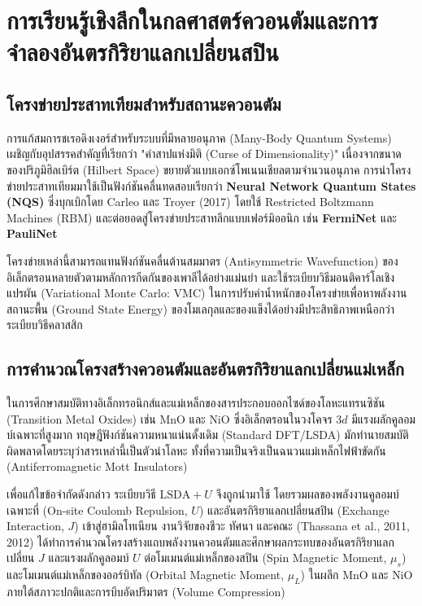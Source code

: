 \section{การเรียนรู้เชิงลึกในกลศาสตร์ควอนตัมและการจำลองอันตรกิริยาแลกเปลี่ยนสปิน}

\subsection{โครงข่ายประสาทเทียมสำหรับสถานะควอนตัม}
การแก้สมการชเรอดิงเงอร์สำหรับระบบที่มีหลายอนุภาค (Many-Body Quantum Systems) เผชิญกับอุปสรรคสำคัญที่เรียกว่า "คำสาปแห่งมิติ (Curse of Dimensionality)" เนื่องจากขนาดของปริภูมิฮิลเบิร์ต (Hilbert Space) ขยายตัวแบบเอกซ์โพเนนเชียลตามจำนวนอนุภาค การนำโครงข่ายประสาทเทียมมาใช้เป็นฟังก์ชันคลื่นทดสอบเรียกว่า \textbf{Neural Network Quantum States (NQS)} ซึ่งบุกเบิกโดย Carleo และ Troyer (2017) โดยใช้ Restricted Boltzmann Machines (RBM) และต่อยอดสู่โครงข่ายประสาทลึกแบบเฟอร์มิออนิก เช่น \textbf{FermiNet} และ \textbf{PauliNet} 

โครงข่ายเหล่านี้สามารถแทนฟังก์ชันคลื่นต้านสมมาตร (Antisymmetric Wavefunction) ของอิเล็กตรอนหลายตัวตามหลักการกีดกันของเพาลีได้อย่างแม่นยำ และใช้ระเบียบวิธีมอนติคาร์โลเชิงแปรผัน (Variational Monte Carlo: VMC) ในการปรับค่าน้ำหนักของโครงข่ายเพื่อหาพลังงานสถานะพื้น (Ground State Energy) ของโมเลกุลและของแข็งได้อย่างมีประสิทธิภาพเหนือกว่าระเบียบวิธีคลาสสิก

\subsection{การคำนวณโครงสร้างควอนตัมและอันตรกิริยาแลกเปลี่ยนแม่เหล็ก}
ในการศึกษาสมบัติทางอิเล็กทรอนิกส์และแม่เหล็กของสารประกอบออกไซด์ของโลหะแทรนซิชัน (Transition Metal Oxides) เช่น $\text{MnO}$ และ $\text{NiO}$ ซึ่งอิเล็กตรอนในวงโคจร $3d$ มีแรงผลักคูลอมบ์เฉพาะที่สูงมาก ทฤษฎีฟังก์ชันความหนาแน่นดั้งเดิม (Standard DFT/LSDA) มักทำนายสมบัติผิดพลาดโดยระบุว่าสารเหล่านี้เป็นตัวนำโลหะ ทั้งที่ความเป็นจริงเป็นฉนวนแม่เหล็กไฟฟ้าขัดกัน (Antiferromagnetic Mott Insulators)

เพื่อแก้ไขข้อจำกัดดังกล่าว ระเบียบวิธี \textbf{$\text{LSDA}+U$} จึงถูกนำมาใช้ โดยรวมผลของพลังงานคูลอมบ์เฉพาะที่ (On-site Coulomb Repulsion, $U$) และอันตรกิริยาแลกเปลี่ยนสปิน (Exchange Interaction, $J$) เข้าสู่ฮามิลโทเนียน งานวิจัยของชีวะ ทัศนา และคณะ (Thassana et al., 2011, 2012) ได้ทำการคำนวณโครงสร้างแถบพลังงานควอนตัมและศึกษาผลกระทบของอันตรกิริยาแลกเปลี่ยน $J$ และแรงผลักคูลอมบ์ $U$ ต่อโมเมนต์แม่เหล็กของสปิน (Spin Magnetic Moment, $\mu_s$) และโมเมนต์แม่เหล็กของออร์บิทัล (Orbital Magnetic Moment, $\mu_L$) ในผลึก $\text{MnO}$ และ $\text{NiO}$ ภายใต้สภาวะปกติและการบีบอัดปริมาตร (Volume Compression) 

